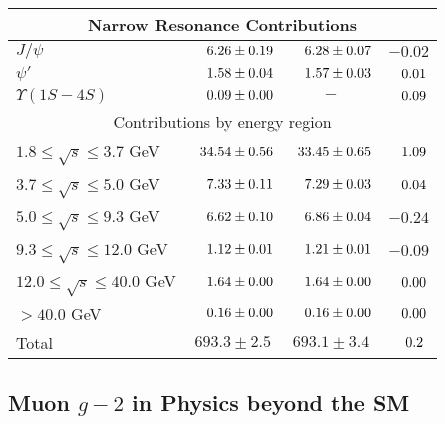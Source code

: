 \begin{table*}
\begin{center}
\begin{tabular}{|l|c|c|c|}
\hline 
\multicolumn{4}{|c|}{Narrow Resonance Contributions} \\
\hline
$J/\psi$         & $\hpzz6.26 \pm 0.19$  & $\hpzz6.28 \pm 0.07$ & $-0.02$ \\
$\psi'$          & $\hpzz1.58 \pm 0.04$  & $\hpzz1.57 \pm 0.03$ & $\hph0.01$ \\
$\Upsilon(1S-4S)$& $\hpzz0.09 \pm 0.00$  & $-$ & $\hph0.09$ \\
\hline 
\multicolumn{4}{|c|}{Contributions by energy region} \\
\hline
  $1.8 \leq \sqrt{s} \leq 3.7$ GeV
       & $\hpz34.54 \pm 0.56$  & $\hpz33.45 \pm 0.65$ & $\hph1.09$\\
  $3.7 \leq \sqrt{s} \leq 5.0$ GeV
       & $\hpzz7.33 \pm 0.11$  & $\hpzz7.29 \pm 0.03$ & $\hph0.04$\\
  $5.0 \leq \sqrt{s} \leq 9.3$ GeV
       & $\hpzz6.62 \pm 0.10$  & $\hpzz6.86 \pm 0.04$ & $-0.24$\\
  $9.3 \leq \sqrt{s} \leq 12.0$ GeV
       & $\hpzz1.12 \pm 0.01$  & $\hpzz1.21 \pm 0.01$ & $-0.09$\\
  $12.0 \leq \sqrt{s} \leq 40.0$ GeV
       & $\hpzz1.64 \pm 0.00$  & $\hpzz1.64 \pm 0.00$ & $\hph0.00$\\
  $> 40.0$ GeV
       & $\hpzz0.16 \pm 0.00$  & $\hpzz0.16 \pm 0.00$ & $\hph0.00$\\
\hline\hline
Total           & $693.3 \pm 2.5$     & $693.1 \pm 3.4$ & $\hph0.2$ \\
\hline
\end{tabular} \end{center} \end{table*}

\subsection{Muon $g-2$ in Physics beyond the SM}

